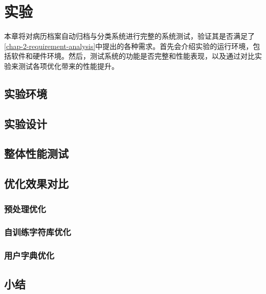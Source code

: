\chapter{实验}
\label{chap:experiments}
本章将对病历档案自动归档与分类系统进行完整的系统测试，验证其是否满足了\autoref{chap-2-requirement-analysis}中提出的各种需求。首先会介绍实验的运行环境，包括软件和硬件环境。然后，测试系统的功能是否完整和性能表现，以及通过对比实验来测试各项优化带来的性能提升。
\section{实验环境}
\section{实验设计}


\section{整体性能测试}

\section{优化效果对比}
\subsection{预处理优化}

\subsection{自训练字符库优化}

\subsection{用户字典优化}

\section{小结}
